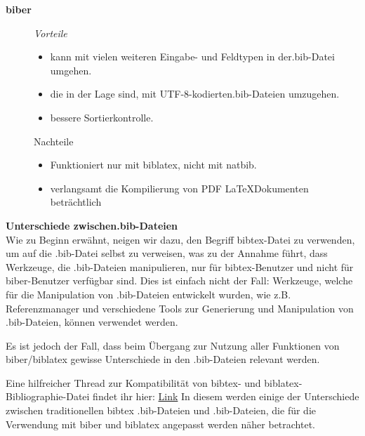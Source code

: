 \textbf{biber}

\begin{description}
	\item[] \emph{Vorteile}
	\begin{itemize}
		\item kann mit vielen weiteren Eingabe- und Feldtypen in der.bib-Datei umgehen.
		\item die in der Lage sind, mit UTF-8-kodierten.bib-Dateien umzugehen.
		\item bessere Sortierkontrolle.
	\end{itemize}
	\item[] Nachteile
	\begin{itemize}
		\item Funktioniert nur mit biblatex, nicht mit natbib.
		\item verlangsamt die Kompilierung von PDF \LaTeX Dokumenten beträchtlich
	\end{itemize}
\end{description}

\textbf{Unterschiede zwischen.bib-Dateien}\\
Wie zu Beginn erwähnt, neigen wir dazu, den Begriff bibtex-Datei zu verwenden, um auf die .bib-Datei selbst zu verweisen, was zu der Annahme führt, dass Werkzeuge, die .bib-Dateien manipulieren, nur für bibtex-Benutzer und nicht für biber-Benutzer verfügbar sind. Dies ist einfach nicht der Fall: Werkzeuge, welche für die Manipulation von .bib-Dateien entwickelt wurden, wie z.B. Referenzmanager und verschiedene Tools zur Generierung und Manipulation von .bib-Dateien, können verwendet werden.

Es ist jedoch der Fall, dass beim Übergang zur Nutzung aller Funktionen von biber/biblatex gewisse Unterschiede in den .bib-Dateien relevant werden.

Eine hilfreicher Thread zur Kompatibilität von bibtex- und biblatex-Bibliographie-Datei findet ihr hier: \href{https://tex.stackexchange.com/questions/37095/compatibility-of-bibtex-and-biblatex-bibliography-files}{Link} In diesem werden einige der Unterschiede zwischen traditionellen bibtex .bib-Dateien und .bib-Dateien, die für die Verwendung mit biber und biblatex angepasst werden näher betrachtet.